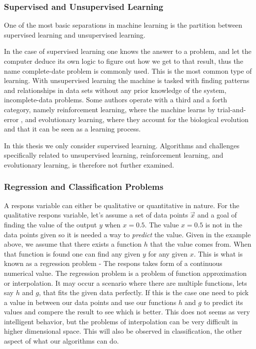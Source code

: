 	\subsubsection{Supervised and Unsupervised Learning }
	One of the most basic separations in machine learning is the partition between supervised learning and unsupervised learning. \cite{gentle2012handbook}
	
	In the case of supervised learning one knows the answer to a problem, and let the computer deduce its own logic to figure out how we get to that result, thus the name complete-date problem is commonly used. This is the most common type of learning. With unsupervised learning the machine is tasked with finding patterns and relationships in data sets without any prior knowledge of the system, incomplete-data problems. Some authors operate with a third and a forth category, namely reinforcement learning, where the machine learns by trial-and-error \cite{marsland2014machine}, and evolutionary learning, where they account for the biological evolution and that it can be seen as a learning process.
		
	In this thesis we only consider supervised learning. Algorithms and challenges specifically related to unsupervised learning, reinforcement learning, and evolutionary learning, is therefore not further examined. 

	\subsubsection{Regression and Classification Problems}
		A respons variable can either be qualitative or quantitative in nature. For the qualitative respons variable, let's assume a set of data points $ \vec{x}$ and a goal of finding the value of the output $y$ when $x = 0.5$. The value $x = 0.5$ is not in the data points given so it is needed a way to \textit{predict} the value. Given in the example above, we assume that there exists a function $h$ that the value comes from. When that function is found one can find any given $y$ for any given $x$. This is what is known as a regression problem - The respons takes form of a continuous numerical value. The regression problem is a problem of function approximation or interpolation. It may occur a scenario where there are multiple functions, lets say $h$ and $g$, that fits the given data perfectly. If this is the case one need to pick a value in between our data points and use our functions $h$ and $g$ to predict its values and compere the result to see which is better. 
	This does not seems as very intelligent behavior, but the problems of interpolation can be very difficult in higher dimensional space. This will also be observed in classification, the other aspect of what our algorithms can do.  
	
